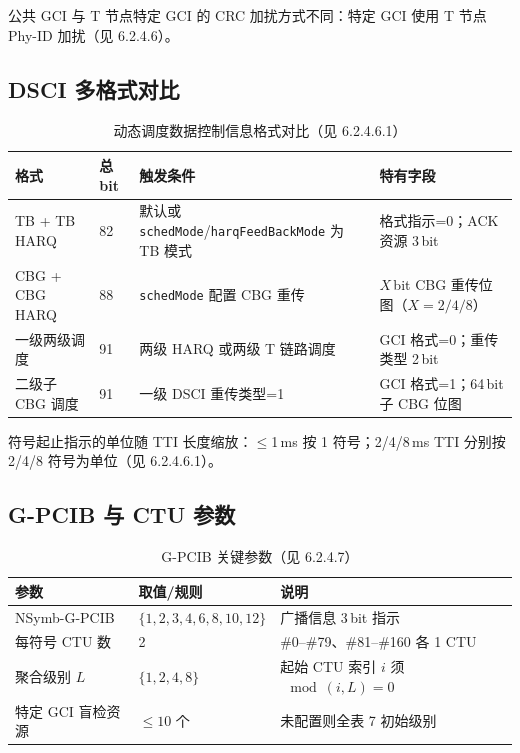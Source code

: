 \documentclass[11pt,a4paper]{ctexart}
\begin{document}
公共 GCI 与 T 节点特定 GCI 的 CRC 加扰方式不同：特定 GCI 使用 T 节点 Phy-ID 加扰（见 6.2.4.6）。

\subsection{DSCI 多格式对比}

\begin{table}[h]
\centering
\small
\caption{动态调度数据控制信息格式对比（见 6.2.4.6.1）}
\begin{tabular}{L{3.8cm}lll}
\toprule
\textbf{格式} & \textbf{总 bit} & \textbf{触发条件} & \textbf{特有字段} \\
\midrule
TB + TB HARQ & 82 & 默认或 \texttt{schedMode}/\texttt{harqFeedBackMode} 为 TB 模式 & 格式指示=0；ACK 资源 3\,bit \\
CBG + CBG HARQ & 88 & \texttt{schedMode} 配置 CBG 重传 & $X$\,bit CBG 重传位图（$X{=}2/4/8$） \\
一级两级调度 & 91 & 两级 HARQ 或两级 T 链路调度 & GCI 格式=0；重传类型 2\,bit \\
二级子 CBG 调度 & 91 & 一级 DSCI 重传类型=1 & GCI 格式=1；64\,bit 子 CBG 位图 \\
\bottomrule
\end{tabular}
\end{table}

符号起止指示的单位随 TTI 长度缩放：$\leq$1\,ms 按 1 符号；2/4/8\,ms TTI 分别按 2/4/8 符号为单位（见 6.2.4.6.1）。

\subsection{G-PCIB 与 CTU 参数}

\begin{table}[h]
\centering
\small
\caption{G-PCIB 关键参数（见 6.2.4.7）}
\begin{tabular}{lll}
\toprule
\textbf{参数} & \textbf{取值/规则} & \textbf{说明} \\
\midrule
NSymb-G-PCIB & $\{1,2,3,4,6,8,10,12\}$ & 广播信息 3\,bit 指示 \\
每符号 CTU 数 & 2 & \#0--\#79、\#81--\#160 各 1 CTU \\
聚合级别 $L$ & $\{1,2,4,8\}$ & 起始 CTU 索引 $i$ 须 $\mod(i,L){=}0$ \\
特定 GCI 盲检资源 & $\leq 10$ 个 & 未配置则全表 7 初始级别 \\
\bottomrule
\end{tabular}
\end{table}
\end{document}
